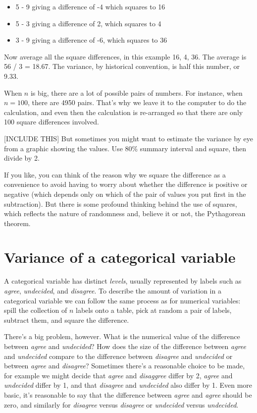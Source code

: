 \documentclass[]{book}
\providecommand{\tightlist}{%
  \setlength{\itemsep}{0pt}\setlength{\parskip}{0pt}}
\begin{document}
\begin{itemize}
\tightlist
\item
  5 - 9 giving a difference of -4 which squares to 16
\item
  5 - 3 giving a difference of 2, which squares to 4
\item
  3 - 9 giving a difference of -6, which squares to 36
\end{itemize}

Now average all the square differences, in this example 16, 4, 36. The average is 56 / 3 = 18.67. The variance, by historical convention, is half this number, or 9.33.

When \(n\) is big, there are a lot of possible pairs of numbers. For instance, when \(n = 100\), there are 4950 pairs. That's why we leave it to the computer to do the calculation, and even then the calculation is re-arranged so that there are only 100 square differences involved.

{[}INCLUDE THIS{]} But sometimes you might want to estimate the variance by eye from a graphic showing the values. Use 80\% summary interval and square, then divide by 2.

If you like, you can think of the reason why we square the difference as a convenience to avoid having to worry about whether the difference is positive or negative (which depends only on which of the pair of values you put first in the subtraction). But there is some profound thinking behind the use of squares, which reflects the nature of randomness and, believe it or not, the Pythagorean theorem.

\hypertarget{variance-of-a-categorical-variable}{%
\section{Variance of a categorical variable}\label{variance-of-a-categorical-variable}}

A categorical variable has distinct \emph{levels}, usually represented by labels such as \emph{agree}, \emph{undecided}, and \emph{disagree}. To describe the amount of variation in a categorical variable we can follow the same process as for numerical variables: spill the collection of \(n\) labels onto a table, pick at random a pair of labels, subtract them, and square the difference.

There's a big problem, however. What is the numerical value of the difference between \emph{agree} and \emph{undecided}? How does the size of the difference between \emph{agree} and \emph{undecided} compare to the difference between \emph{disagree} and \emph{undecided} or between \emph{agree} and \emph{disagree}? Sometimes there's a reasonable choice to be made, for example we might decide that \emph{agree} and \emph{disaggree} differ by 2, \emph{agree} and \emph{undecided} differ by 1, and that \emph{disagree} and \emph{undecided} also differ by 1. Even more basic, it's reasonable to say that the difference between \emph{agree} and \emph{agree} should be zero, and similarly for \emph{disagree} versus \emph{disagree} or \emph{undecided} versus \emph{undecided}.
\end{document}
